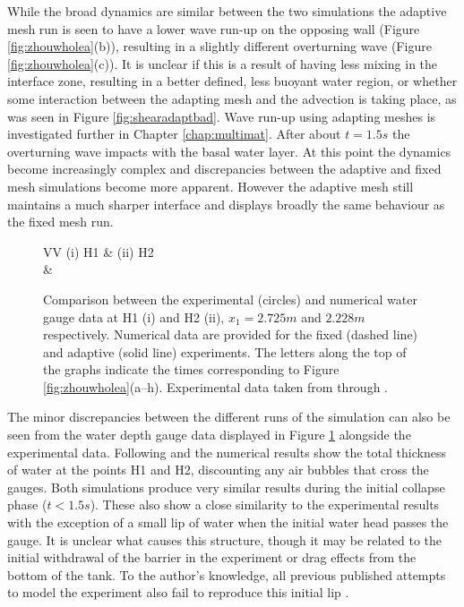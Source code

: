 While the broad dynamics are similar between the two simulations the adaptive mesh run is seen to have a lower wave run-up on the opposing wall (Figure \ref{fig:zhouwholea}(b)), resulting in a slightly different overturning wave (Figure \ref{fig:zhouwholea}(c)).  It is unclear if this is a result of having less mixing in the interface zone, resulting in a better defined, less buoyant water region, or whether some interaction between the adapting mesh and the advection is taking place, as was seen in Figure \ref{fig:shearadaptbad}.  Wave run-up using adapting meshes is investigated further in Chapter \ref{chap:multimat}.  After about $t=1.5s$ the overturning wave impacts with the basal water layer.  At this point the dynamics become increasingly complex and discrepancies between the adaptive and fixed mesh simulations become more apparent.  However the adaptive mesh still maintains a much sharper interface and displays broadly the same behaviour as the fixed mesh run.

\begin{figure}[tbp]
\begin{center}
\begin{tabular}{VV}
\hspace{1cm}(i) H1 & (ii) H2  \\
 & \\
\end{tabular}
\caption{Comparison between the experimental (circles) and numerical water gauge data at H1 (i) and H2 (ii), $x_1 = 2.725m$ and $2.228m$ respectively.  Numerical data are provided for the fixed (dashed line) and adaptive (solid line) experiments.  The letters along the top of the graphs indicate the times corresponding to Figure \ref{fig:zhouwholea}(a--h).  Experimental data taken from \citet{zhou_nonlinear_1999} through \citet{park_volume-of-fluid_2009}.}
\label{fig:zhoudepth}
\end{center}
\end{figure}

The minor discrepancies between the different runs of the simulation can also be seen from the water depth gauge data displayed in Figure \ref{fig:zhoudepth} alongside the experimental data.  Following \citet{colagrossi_numerical_2003} and \citet{park_volume-of-fluid_2009} the numerical results show the total thickness of water at the points H1 and H2, discounting any air bubbles that cross the gauges.  Both simulations produce very similar results during the initial collapse phase ($t<1.5s$).  These also show a close similarity to the experimental results with the exception of a small lip of water when the initial water head passes the gauge.  It is unclear what causes this structure, though it may be related to the initial withdrawal of the barrier in the experiment or drag effects from the bottom of the tank.  To the author's knowledge, all previous published attempts to model the experiment also fail to reproduce this initial lip \citep{zhou_nonlinear_1999, lee_numerical_2002, colagrossi_numerical_2003, park_volume-of-fluid_2009}.

